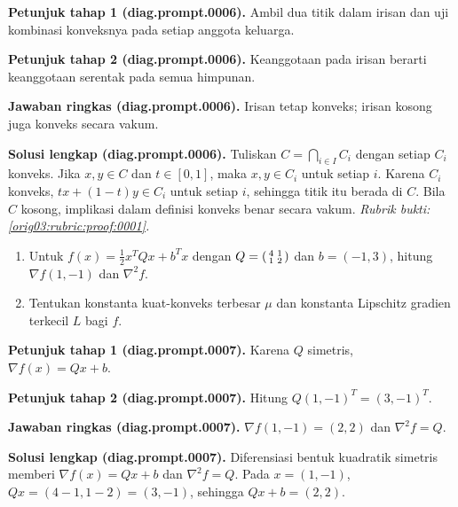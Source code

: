 \par\noindent\textbf{Petunjuk tahap 1 (diag.prompt.0006).}
Ambil dua titik dalam irisan dan uji kombinasi konveksnya pada setiap anggota
keluarga.
\label{orig03:diag:hint1:0006}
\par\noindent\textbf{Petunjuk tahap 2 (diag.prompt.0006).}
Keanggotaan pada irisan berarti keanggotaan serentak pada semua himpunan.
\label{orig03:diag:hint2:0006}
\par\noindent\textbf{Jawaban ringkas (diag.prompt.0006).}
Irisan tetap konveks; irisan kosong juga konveks secara vakum.
\label{orig03:diag:answer:0006}
\par\noindent\textbf{Solusi lengkap (diag.prompt.0006).}
Tuliskan $C=\bigcap_{i\in I}C_i$ dengan setiap $C_i$ konveks. Jika
$x,y\in C$ dan $t\in[0,1]$, maka $x,y\in C_i$ untuk setiap $i$. Karena
$C_i$ konveks, $tx+(1-t)y\in C_i$ untuk setiap $i$, sehingga titik itu berada
di $C$. Bila $C$ kosong, implikasi dalam definisi konveks benar secara vakum.
\emph{Rubrik bukti: \ref{orig03:rubric:proof:0001}.}
\label{orig03:diag:solution:0006}

\begin{exercise}
\label{orig03:diag:problem:0004}
\begin{enumerate}
\item\label{orig03:diag:prompt:0007}
Untuk $f(x)=\tfrac12x^TQx+b^Tx$ dengan
$Q=\begin{psmallmatrix}4&1\\1&2\end{psmallmatrix}$ dan $b=(-1,3)$,
hitung $\nabla f(1,-1)$ dan $\nabla^2f$.
\item\label{orig03:diag:prompt:0008}
Tentukan konstanta kuat-konveks terbesar $\mu$ dan konstanta Lipschitz gradien
terkecil $L$ bagi $f$.
\end{enumerate}
\end{exercise}

\par\noindent\textbf{Petunjuk tahap 1 (diag.prompt.0007).}
Karena $Q$ simetris, $\nabla f(x)=Qx+b$.
\label{orig03:diag:hint1:0007}
\par\noindent\textbf{Petunjuk tahap 2 (diag.prompt.0007).}
Hitung $Q(1,-1)^T=(3,-1)^T$.
\label{orig03:diag:hint2:0007}
\par\noindent\textbf{Jawaban ringkas (diag.prompt.0007).}
$\nabla f(1,-1)=(2,2)$ dan $\nabla^2f=Q$.
\label{orig03:diag:answer:0007}
\par\noindent\textbf{Solusi lengkap (diag.prompt.0007).}
Diferensiasi bentuk kuadratik simetris memberi $\nabla f(x)=Qx+b$ dan
$\nabla^2f=Q$. Pada $x=(1,-1)$,
$Qx=(4-1,1-2)=(3,-1)$, sehingga $Qx+b=(2,2)$.
\label{orig03:diag:solution:0007}

